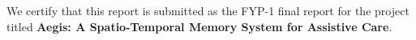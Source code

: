 We certify that this report is submitted as the FYP-1 final report for the
project titled \textbf{Aegis: A Spatio-Temporal Memory System for Assistive Care}.
\signatureblock
